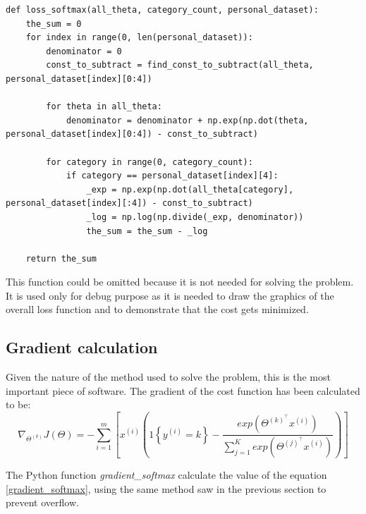 \documentclass[a4paper,11pt,oneside]{book}
\begin{document}
\begin{lstlisting}
def loss_softmax(all_theta, category_count, personal_dataset):
    the_sum = 0
    for index in range(0, len(personal_dataset)):
        denominator = 0
        const_to_subtract = find_const_to_subtract(all_theta, personal_dataset[index][0:4])
		
        for theta in all_theta:
            denominator = denominator + np.exp(np.dot(theta, personal_dataset[index][0:4]) - const_to_subtract)
		
        for category in range(0, category_count):
            if category == personal_dataset[index][4]:
                _exp = np.exp(np.dot(all_theta[category], personal_dataset[index][:4]) - const_to_subtract)
                _log = np.log(np.divide(_exp, denominator))
                the_sum = the_sum - _log
	
	return the_sum
\end{lstlisting}

This function could be omitted because it is not needed for solving the problem. It is used only for debug purpose as it is needed to draw the graphics of the overall loss function and to demonstrate that the cost gets minimized.

\subsection{Gradient calculation}
Given the nature of the method used to solve the problem, this is the most important piece of software. The gradient of the cost function has been calculated to be:
\begin{equation}
	\nabla_{\Theta^{(k)}}J(\Theta) = - \sum_{i=1}^{m} \left[ x^{(i)} \left( 1 \left\{ y^{(i)}=k \right\} -     \dfrac{exp\left(\Theta^{(k)^{\top}}x^{(i)} \right)}{ \sum_{j=1}^{K} exp\left(\Theta^{(j)^{\top}}x^{(i)} \right)}      \right) \right]
	\label{gradient_softmax}
\end{equation}

The Python function \textit{gradient\_softmax} calculate the value of the equation \ref{gradient_softmax}, using the same method saw in the previous section to prevent overflow.
\end{document}
